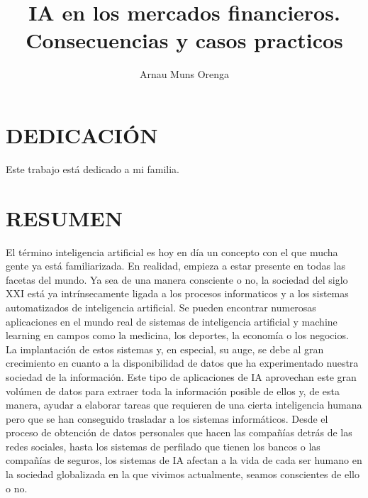 \documentclass[]{DissertateUSU}
\title{IA en los mercados financieros. Consecuencias y casos practicos}
\author{Arnau Muns Orenga}
\date{}
\begin{document}
\maketitle

\pagestyle{empty}
\copyrightpage

\newpage
{}
\fancyhead[R]{\thepage}
\fancyfoot[C]{}
\chapter*{\textbf{DEDICACIÓN}}

Este trabajo está dedicado a mi familia.

\newpage
\pagestyle{fancy}
\fancyhead[R]{\thepage}
\fancyfoot[C]{}
\chapter*{\textbf{RESUMEN}}

El término inteligencia artificial es hoy en día un concepto con el que
mucha gente ya está familiarizada. En realidad, empieza a estar presente
en todas las facetas del mundo. Ya sea de una manera consciente o no, la
sociedad del siglo XXI está ya intrínsecamente ligada a los procesos
informaticos y a los sistemas automatizados de inteligencia artificial.
Se pueden encontrar numerosas aplicaciones en el mundo real de sistemas
de inteligencia artificial y machine learning en campos como la
medicina, los deportes, la economía o los negocios. La implantación de
estos sistemas y, en especial, su auge, se debe al gran crecimiento en
cuanto a la disponibilidad de datos que ha experimentado nuestra
sociedad de la información. Este tipo de aplicaciones de IA aprovechan
este gran volúmen de datos para extraer toda la información posible de
ellos y, de esta manera, ayudar a elaborar tareas que requieren de una
cierta inteligencia humana pero que se han conseguido trasladar a los
sistemas informáticos. Desde el proceso de obtención de datos personales
que hacen las compañías detrás de las redes sociales, hasta los sistemas
de perfilado que tienen los bancos o las compañías de seguros, los
sistemas de IA afectan a la vida de cada ser humano en la sociedad
globalizada en la que vivimos actualmente, seamos conscientes de ello o
no.

\setlength\parskip{5ex}
\end{document}
